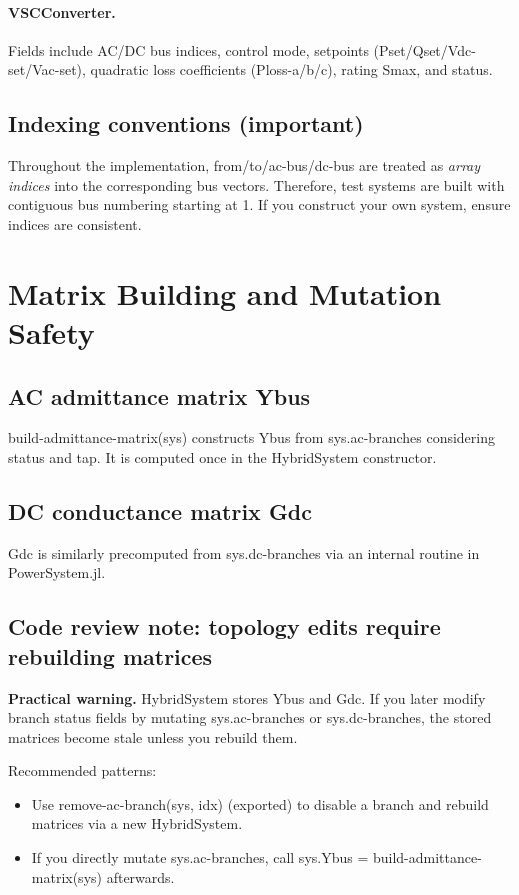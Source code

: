 \documentclass[11pt]{article}
\def\code#1{#1}%
\def\_{-}%
\newcommand{\code}[1]{\nolinkurl{#1}}
\begin{document}
\paragraph{\code{VSCConverter}.} Fields include AC/DC bus indices, control \code{mode}, setpoints (\code{Pset/Qset/Vdc\_set/Vac\_set}), quadratic loss coefficients (\code{Ploss\_a/b/c}), rating \code{Smax}, and \code{status}.

\subsection{Indexing conventions (important)}
Throughout the implementation, \code{from/to/ac\_bus/dc\_bus} are treated as \emph{array indices} into the corresponding bus vectors. Therefore, test systems are built with contiguous bus numbering starting at 1. If you construct your own system, ensure indices are consistent.

\section{Matrix Building and Mutation Safety}

\subsection{AC admittance matrix \code{Ybus}}
\code{build\_admittance\_matrix(sys)} constructs \code{Ybus} from \code{sys.ac\_branches} considering \code{status} and \code{tap}. It is computed once in the \code{HybridSystem} constructor.

\subsection{DC conductance matrix \code{Gdc}}
\code{Gdc} is similarly precomputed from \code{sys.dc\_branches} via an internal routine in \code{PowerSystem.jl}.

\subsection{Code review note: topology edits require rebuilding matrices}
\textbf{Practical warning.} \code{HybridSystem} stores \code{Ybus} and \code{Gdc}. If you later modify branch status fields by mutating \code{sys.ac\_branches} or \code{sys.dc\_branches}, the stored matrices become stale unless you rebuild them.

Recommended patterns:
\begin{itemize}[leftmargin=*]
  \item Use \code{remove\_ac\_branch(sys, idx)} (exported) to disable a branch and rebuild matrices via a new \code{HybridSystem}.
  \item If you directly mutate \code{sys.ac\_branches}, call \code{sys.Ybus = build\_admittance\_matrix(sys)} afterwards.
\end{itemize}
\end{document}

